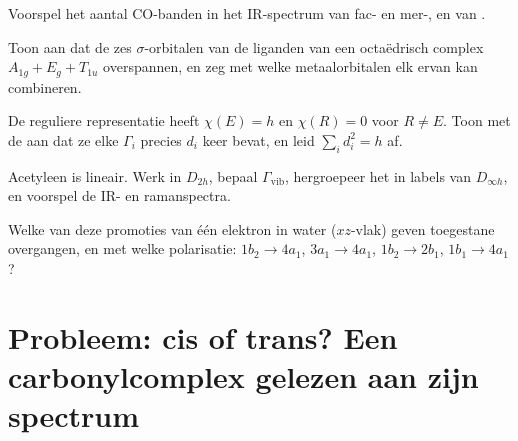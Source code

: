 \begin{exercise}[$\star\star$]\label{exo:b3:group-theory-applied:8}
Voorspel het aantal CO-banden in het IR-spectrum van fac- en
mer-, en van
.
\end{exercise}

\begin{exercise}[$\star\star$]\label{exo:b3:group-theory-applied:9}
Toon aan dat de zes $\sigma$-orbitalen van de liganden van een octaëdrisch
complex
$A_{1g} + E_g + T_{1u}$ overspannen, en zeg met welke metaalorbitalen elk
ervan kan combineren.
\end{exercise}

\begin{exercise}[$\star\star\star$]\label{exo:b3:group-theory-applied:10}
De reguliere representatie heeft $\chi(E) = h$ en $\chi(R) = 0$ voor $R \ne E$. Toon
met de  aan dat ze elke  $\Gamma_i$ precies $d_i$ keer bevat, en leid $\sum_id_i^2 = h$ af.
\end{exercise}

\begin{exercise}[$\star\star\star$]\label{exo:b3:group-theory-applied:11}
Acetyleen  is lineair. Werk in $D_{2h}$, bepaal $\Gamma_{\mathrm{vib}}$,
hergroepeer het
in labels van $D_{\infty h}$, en voorspel de IR- en ramanspectra.
\end{exercise}

\begin{exercise}[$\star\star\star$]\label{exo:b3:group-theory-applied:12}
Welke van deze promoties van één elektron in water ($xz$-vlak) geven
toegestane overgangen, en met welke polarisatie: $1b_2 \to 4a_1$, $3a_1 \to 4a_1$,
$1b_2 \to 2b_1$, $1b_1 \to 4a_1$?
\end{exercise}

\section{Probleem: cis of trans? Een carbonylcomplex gelezen aan zijn spectrum}

